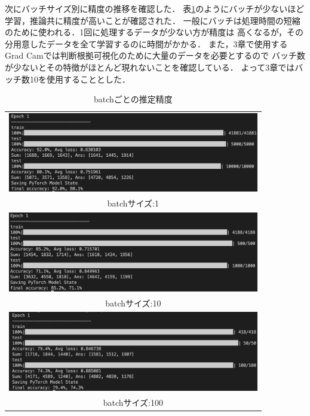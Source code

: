 \clearpage

次にバッチサイズ別に精度の推移を確認した．
表\ref{batch}のようにバッチが少ないほど学習，推論共に精度が高いことが確認された．
一般にバッチは処理時間の短縮のために使われる．1回に処理するデータが少ない方が精度は
高くなるが，その分用意したデータを全て学習するのに時間がかかる．
また，3章で使用するGrad Camでは判断根拠可視化のために大量のデータを必要とするので
バッチ数が少ないとその特徴がほとんど現れないことを確認している．
よって3章ではバッチ数10を使用することとした．

\begin{table}[b]
  \begin{center}
    \begin{tabular}{c}
        \includegraphics[width=110mm]{images/net_result/batch1.png} \\ batchサイズ:1 \\
        \includegraphics[width=110mm]{images/net_result/batch10.png} \\ batchサイズ:10 \\
        \includegraphics[width=110mm]{images/net_result/batch100.png} \\ batchサイズ:100 \\
    \end{tabular}
  \end{center}
  \caption{batchごとの推定精度}
  \label{batch}
\end{table}
\clearpage

